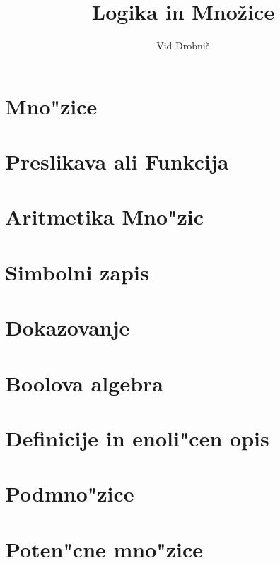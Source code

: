 \documentclass[a4paper, 12pt]{article}
\title{Logika in Množice}
\author{Vid Drobnič}
\date{}
\begin{document}
	\maketitle
	\thispagestyle{empty}
	\pagebreak
	\setcounter{page}{1}
	
	\tableofcontents
	\pagebreak
	
	\section{Mno"zice}
	
	
	\section{Preslikava ali Funkcija}
	
	
	\section{Aritmetika Mno"zic}
	
	
	\section{Simbolni zapis}
	
	
	\section{Dokazovanje}
	
	
	\section{Boolova algebra}
	
	
	\section{Definicije in enoli"cen opis}
	
	
	\section{Podmno"zice}
	
	
	\section{Poten"cne mno"zice}
	
\end{document}
